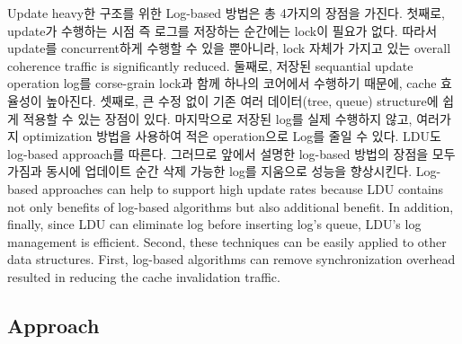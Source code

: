 %
\ifkor
Update heavy한 구조를 위한 Log-based 방법은 총 4가지의 장점을 가진다. 
첫째로, update가 수행하는 시점 즉 로그를 저장하는 순간에는 lock이 필요가 없다. 
따라서 update를 concurrent하게 수행할 수 있을 뿐아니라, lock 자체가 가지고 있는 overall
coherence traffic is significantly reduced.
둘째로, 저장된 sequantial update operation log를 corse-grain lock과 함께 하나의 코어에서 수행하기
때문에, cache 효율성이 높아진다.
셋째로, 큰 수정 없이 기존 여러 데이터(tree, queue) structure에 쉽게 적용할 수 있는 장점이 있다.
마지막으로 저장된 log를 실제 수행하지 않고, 여러가지 optimization 방법을 사용하여 적은 operation으로 Log를 줄일 수
있다. 
LDU도 log-based approach를 따른다. 그러므로 앞에서 설명한 log-based 방법의 장점을 모두 가짐과 동시에
업데이트 순간 삭제 가능한 log를 지움으로 성능을 향상시킨다.
\else
Log-based approaches can help to support high update rates because
LDU contains not only benefits of log-based algorithms but also additional benefit.
In addition, finally, since LDU can eliminate log before inserting log's queue,
LDU's log management is efficient.
Second, these techniques can be easily applied to other data structures.
First, log-based algorithms can remove synchronization overhead resulted in
reducing the cache invalidation traffic.
\fi


\subsection{Approach}

